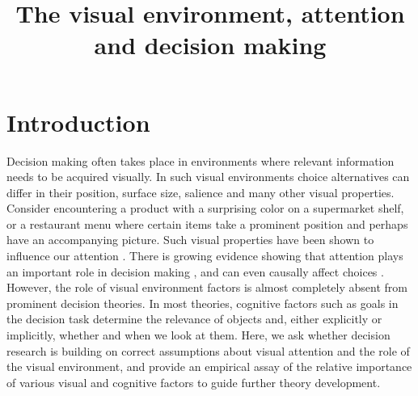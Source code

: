 \documentclass[english,natbib,man,floatsintext]{apa6}
\title{The visual environment, attention and decision making}
\begin{document}
\linenumbers
\maketitle


\section{Introduction}


Decision making often takes place in environments where relevant information needs to be acquired visually. In such visual environments choice alternatives can differ in their position, surface size, salience and many other visual properties. Consider encountering a product with a surprising color on a supermarket shelf, or a restaurant menu where certain items take a prominent position and perhaps have an accompanying picture. Such visual properties have been shown to influence our attention \citep{corbetta2002a,borji2012a, dehaene2003a,clarke2014a,rosenholtz2007a}. There is growing evidence showing that attention plays an important role in decision making \citep{gidloef2017a,krajbich2010a,stojic2020uncertainty, callaway2019a,gluth2018, gluth2020}, and can even causally affect choices \citep{ghaffari2018a, paernamets2015a, shimojo2003a}. However, the role of visual environment factors is almost completely absent from prominent decision theories. In most theories, cognitive factors such as goals in the decision task determine the relevance of objects and, either explicitly or implicitly, whether and when we look at them. Here, we ask whether decision research is building on correct assumptions about visual attention and the role of the visual environment, and provide an empirical assay of the relative importance of various visual and cognitive factors to guide further theory development.\\
\end{document}
